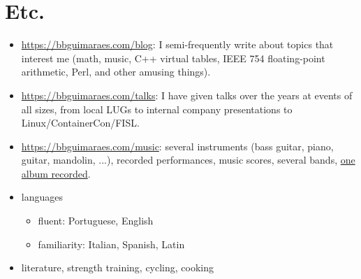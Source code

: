 \section*{Etc.}

\begin{itemize}
    \item
        \url{https://bbguimaraes.com/blog}: I semi-frequently write about topics
        that interest me (math, music, C++ virtual tables, IEEE 754
        floating-point arithmetic, Perl, and other amusing things).
    \item
        \url{https://bbguimaraes.com/talks}: I have given talks over the years
        at events of all sizes, from local LUGs to internal company
        presentations to Linux\slash ContainerCon\slash FISL.
    \item
        \url{https://bbguimaraes.com/music}: several instruments (bass guitar,
        piano, guitar, mandolin, ...), recorded performances, music scores,
        several bands, \href{https://www.youtube.com/larajackpot}{one album
        recorded}.
    \item
        languages
        \begin{itemize}
            \item fluent: Portuguese, English
            \item familiarity: Italian, Spanish, Latin
        \end{itemize}
    \item literature, strength training, cycling, cooking
\end{itemize}

